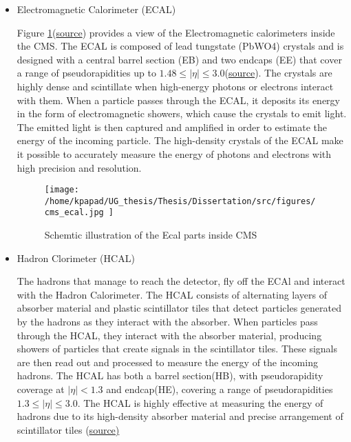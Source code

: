 \begin{itemize}
\item Electromagnetic Calorimeter (ECAL)
\label{sec:org54126fa}

Figure \ref{fig:cms_ecal}(\href{https://www.slideserve.com/mac/requirements-and-status-of-the-cms-ecal-calorimeter}{source}) provides a view of the Electromagnetic calorimeters inside the CMS. The ECAL is composed of lead tungstate (PbWO4) crystals and is designed with a central barrel section (EB) and two endcaps (EE) that cover a range of pseudorapidities up to \(1.48\leq|\eta| \leq 3.0\)(\href{https://iopscience.iop.org/article/10.1088/1742-6596/587/1/012001}{source}). The crystals are highly dense and scintillate when high-energy photons or electrons interact with them. When a particle passes through the ECAL, it deposits its energy in the form of electromagnetic showers, which cause the crystals to emit light. The emitted light is then captured and amplified in order to estimate the energy of the incoming particle. The high-density crystals of the ECAL make it possible to accurately measure the energy of photons and electrons with high precision and resolution. 

\begin{figure}[ht]
\centering
\texttt{[image: /home/kpapad/UG\_thesis/Thesis/Dissertation/src/figures/cms\_ecal.jpg ]}
\caption{Schemtic illustration of the Ecal parts inside CMS }
\label{fig:cms_ecal}
\end{figure}


\item Hadron Clorimeter (HCAL)
\label{sec:orgbfeffb5}

The hadrons that manage to reach the detector, fly off the ECAl and interact with the Hadron Calorimeter. The HCAL consists of alternating layers of absorber material and plastic scintillator tiles that detect particles generated by the hadrons as they interact with the absorber.  When particles pass through the HCAL, they interact with the absorber material, producing showers of particles that create signals in the scintillator tiles. These signals are then read out and processed to measure the energy of the incoming hadrons. The HCAL has both a barrel section(HB), with pseudorapidity coverage at \(|\eta|<1.3\) and endcap(HE), covering a range of pseudorapidities \(1.3\leq|\eta| \leq 3.0\). The HCAL is highly effective at measuring the energy of hadrons due to its high-density absorber material and precise arrangement of scintillator tiles
(\href{https://www.slac.stanford.edu/econf/C060717/papers/L012.PDF}{source)}
\end{itemize}

